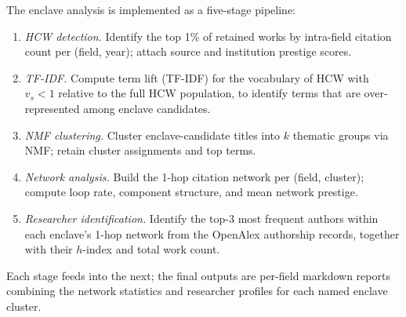 The enclave analysis is implemented as a five-stage pipeline:
\begin{enumerate}
  \item[\textbf{E1.}] \emph{HCW detection.}  Identify the top 1\% of retained
  works by intra-field citation count per (field, year); attach source and
  institution prestige scores.
  \item[\textbf{E2.}] \emph{TF-IDF.}  Compute term lift (TF-IDF) for the
  vocabulary of HCW with $v_s < 1$ relative to the full HCW population, to
  identify terms that are over-represented among enclave candidates.
  \item[\textbf{E3.}] \emph{NMF clustering.}  Cluster enclave-candidate titles
  into $k$ thematic groups via NMF; retain cluster assignments and top terms.
  \item[\textbf{E4.}] \emph{Network analysis.}  Build the 1-hop citation
  network per (field, cluster); compute loop rate, component structure, and
  mean network prestige.
  \item[\textbf{E5.}] \emph{Researcher identification.}  Identify the top-3
  most frequent authors within each enclave's 1-hop network from the OpenAlex
  authorship records, together with their $h$-index and total work count.
\end{enumerate}
Each stage feeds into the next; the final outputs are per-field markdown
reports combining the network statistics and researcher profiles for each
named enclave cluster.
